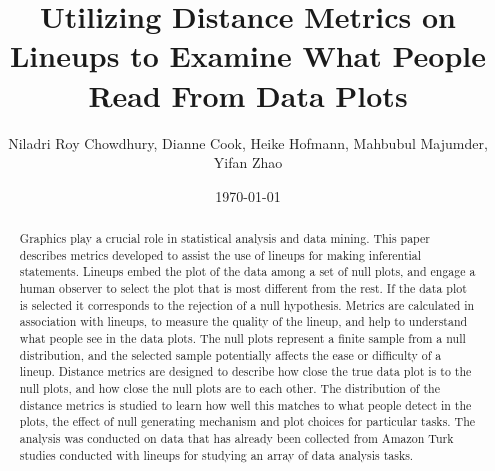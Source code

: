 \documentclass[12]{article}
\begin{document}
\title{Utilizing Distance Metrics on Lineups to Examine What People Read From Data Plots}
\author{Niladri Roy Chowdhury, Dianne Cook, Heike Hofmann, Mahbubul Majumder, Yifan Zhao}
\date{\today}  %
\maketitle

\begin {abstract} 
Graphics play a crucial role in statistical analysis and data mining. This paper describes metrics developed to assist the use of lineups for making inferential statements. Lineups embed the plot of the data among a set of null plots, and engage a human observer to select the plot that is most different from the rest. If the data plot is selected it corresponds to the rejection of a null hypothesis. Metrics are calculated in association with lineups, to measure the quality of the lineup, and help to understand what people see in the data plots.  The null plots represent a finite sample from a null distribution, and the selected sample potentially affects the ease or difficulty of a lineup. Distance metrics are designed to describe how close the true data plot is to the null plots, and how close the null plots are to each other. The distribution of the distance metrics is studied to learn how well this matches to what people detect in the plots, the effect of null generating mechanism and plot choices for particular tasks.  The analysis was conducted on data that has already been collected from Amazon Turk studies conducted with lineups for studying an array of data analysis tasks.

\end {abstract}
\end{document}

